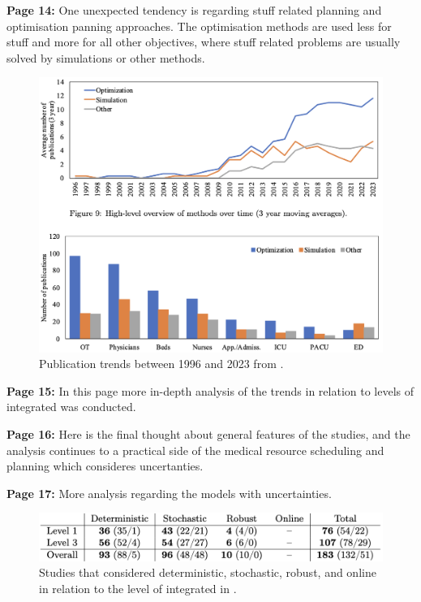     \textbf{Page 14:}
    One unexpected tendency is regarding stuff related planning and optimisation panning approaches. The optimisation methods are used less for stuff and more for all other objectives, where stuff related problems are usually solved by simulations or other methods.
    \begin{figure}[H]
        \centering
        \includegraphics[width=1\textwidth]{figures/SR0010NL23/fig6.png}
        \caption{Publication trends between 1996 and 2023 from \cite{x338}.}
        \label{fig6:SR0010NL23}
    \end{figure}

    \textbf{Page 15:}
    In this page more in-depth analysis of the trends in relation to levels of integrated was conducted.
    
    \textbf{Page 16:}
    Here is the final thought about general features of the studies, and the analysis continues to a practical side of the medical resource scheduling and planning which consideres uncertanties.
    
    \textbf{Page 17:}
    More analysis regarding the models with uncertainties.
    \begin{figure}[H]
        \centering
        \includegraphics[width=1\textwidth]{figures/SR0010NL23/fig7.png}
        \caption{Studies that considered deterministic, stochastic, robust, and online in relation to the level of integrated in \cite{x338}.}
        \label{fig7:SR0010NL23}
    \end{figure}

